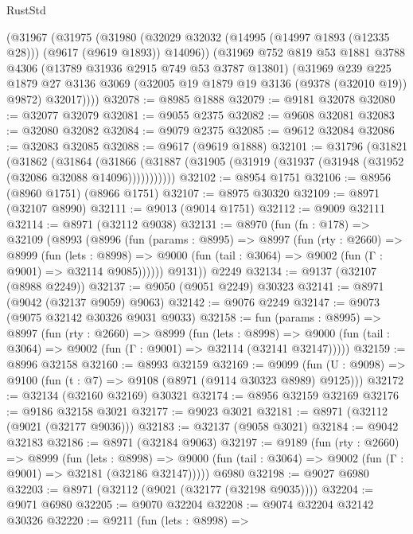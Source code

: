 \begin{lexlean}{RustStd}
\begin{coremodule}
    (@31967
      (@31975
        (@31980 (@32029 @32032 (@14995 (@14997 @1893 (@12335 @28))) (@9617 (@9619 @1893)) @14096))
        (@31969
          @752
          @819
          @53
          @1881
          @3788
          @4306
          (@13789 @31936 @2915 @749 @53 @3787 @13801)
          (@31969
            @239
            @225
            @1879
            @27
            @3136
            @3069
            (@32005 @19 @1879 @19 @3136 (@9378 (@32010 @19)) @9872)
            @32017))))
@32078 := @8985 @1888
@32079 := @9181 @32078
@32080 := @32077 @32079
@32081 := @9055 @2375
@32082 := @9608 @32081
@32083 := @32080 @32082
@32084 := @9079 @2375
@32085 := @9612 @32084
@32086 := @32083 @32085
@32088 := @9617 (@9619 @1888)
@32101 := @31796
    (@31821
      (@31862
        (@31864
          (@31866 (@31887 (@31905 (@31919 (@31937 (@31948 (@31952 (@32086 @32088 @14096)))))))))))
@32102 := @8954 @1751
@32106 := @8956 (@8960 @1751) (@8966 @1751)
@32107 := @8975 @30320
@32109 := @8971 (@32107 @8990)
@32111 := @9013 (@9014 @1751)
@32112 := @9009 @32111
@32114 := @8971 (@32112 @9038)
@32131 := @8970
    (fun (fn : @178) =>
    @32109
      (@8993
        (@8996
          (fun (params : @8995) =>
          @8997
            (fun (rty : @2660) =>
            @8999
              (fun (lets : @8998) =>
              @9000 (fun (tail : @3064) => @9002 (fun (Γ : @9001) => @32114 @9085))))))
        @9131))
    @2249
@32134 := @9137 (@32107 (@8988 @2249))
@32137 := @9050 (@9051 @2249) @30323
@32141 := @8971 (@9042 (@32137 @9059) @9063)
@32142 := @9076 @2249
@32147 := @9073 (@9075 @32142 @30326 @9031 @9033)
@32158 := fun (params : @8995) =>
  @8997
    (fun (rty : @2660) =>
    @8999
      (fun (lets : @8998) =>
      @9000 (fun (tail : @3064) => @9002 (fun (Γ : @9001) => @32114 (@32141 @32147)))))
@32159 := @8996 @32158
@32160 := @8993 @32159
@32169 := @9099
    (fun (U : @9098) => @9100 (fun (t : @7) => @9108 (@8971 (@9114 @30323 @8989) @9125)))
@32172 := @32134 (@32160 @32169) @30321
@32174 := @8956 @32159 @32169
@32176 := @9186 @32158 @3021
@32177 := @9023 @3021
@32181 := @8971 (@32112 (@9021 (@32177 @9036)))
@32183 := @32137 (@9058 @3021)
@32184 := @9042 @32183
@32186 := @8971 (@32184 @9063)
@32197 := @9189
    (fun (rty : @2660) =>
    @8999
      (fun (lets : @8998) =>
      @9000 (fun (tail : @3064) => @9002 (fun (Γ : @9001) => @32181 (@32186 @32147)))))
    @6980
@32198 := @9027 @6980
@32203 := @8971 (@32112 (@9021 (@32177 (@32198 @9035))))
@32204 := @9071 @6980
@32205 := @9070 @32204
@32208 := @9074 @32204 @32142 @30326
@32220 := @9211
    (fun (lets : @8998) =>

\end{coremodule}
\end{lexlean}
